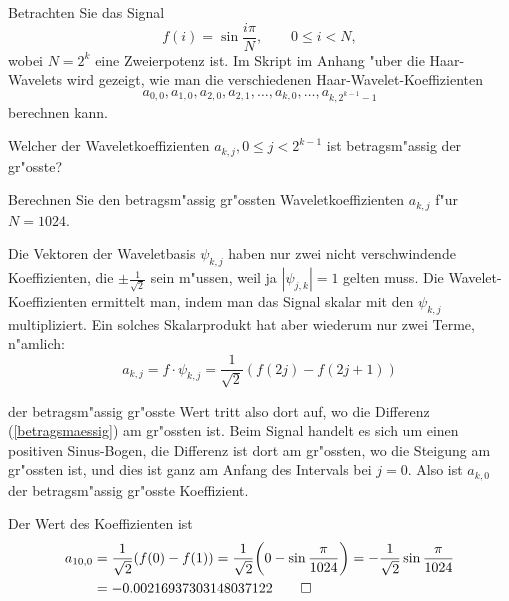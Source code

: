 Betrachten Sie das Signal
\[
f(i)=\sin\frac{i\pi}{N}, \qquad 0\le i<N,
\]
wobei $N=2^k$ eine Zweierpotenz ist.
Im Skript im Anhang "uber die Haar-Wavelets wird gezeigt,
wie man die verschiedenen Haar-Wavelet-Koeffizienten
$$a_{0,0},a_{1,0}, a_{2,0},a_{2,1},\dots ,a_{k,0},\dots, a_{k,2^{k-1}-1}$$
berechnen kann.
\begin{teilaufgaben}
\item
Welcher der Waveletkoeffizienten $a_{k,j}, 0\le j<2^{k-1}$ ist betragsm"assig
der gr"osste?
\item
Berechnen Sie den betragsm"assig gr"ossten Waveletkoeffizienten $a_{k,j}$
f"ur $N=1024$.
\end{teilaufgaben}

\begin{loesung}
Die Vektoren der Waveletbasis $\psi_{k,j}$ haben nur zwei nicht verschwindende
Koeffizienten, die $\pm\frac1{\sqrt{2}}$ sein m"ussen, weil ja $|\psi_{j,k}|=1$
gelten muss. Die Wavelet-Koeffizienten ermittelt man, indem man das Signal
skalar mit den $\psi_{k,j}$ multipliziert. Ein solches Skalarprodukt hat
aber wiederum nur zwei Terme, n"amlich:
\begin{equation}
a_{k,j}=f\cdot \psi_{k,j} = \frac1{\sqrt{2}}(f(2j)-f(2j+1))
\label{betragsmaessig}
\end{equation}
\begin{teilaufgaben}
\item der betragsm"assig gr"osste Wert tritt also dort auf, wo die Differenz
(\ref{betragsmaessig}) am gr"ossten ist. Beim Signal handelt es sich um
einen positiven Sinus-Bogen, die Differenz ist dort am gr"ossten, wo die
Steigung am gr"ossten ist, und dies ist ganz am Anfang des Intervals bei
$j=0$. Also ist $a_{k,0}$ der betragsm"assig gr"osste Koeffizient.
\item Der Wert des Koeffizienten ist
\begin{align*}
a_{10,0}&=\frac1{\sqrt{2}}(f(0)-f(1))=\frac1{\sqrt{2}}\biggl(0-\sin\frac{\pi}{1024}\biggr)
=-\frac1{\sqrt{2}}\sin\frac{\pi}{1024}\\
&=-0.00216937303148037122
\qedhere
\end{align*}
\end{teilaufgaben}
\end{loesung}

